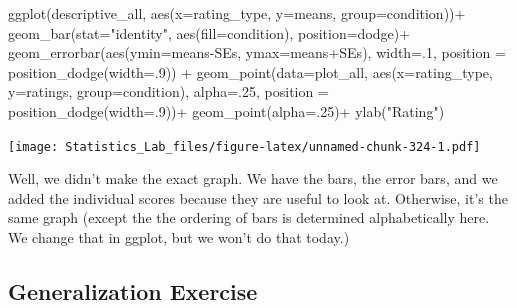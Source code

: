 \documentclass[
]{book}
\newenvironment{Shaded}{\begin{snugshade}}{\end{snugshade}}
\newcommand{\AttributeTok}[1]{\textcolor[rgb]{0.77,0.63,0.00}{#1}}
\newcommand{\DecValTok}[1]{\textcolor[rgb]{0.00,0.00,0.81}{#1}}
\newcommand{\FunctionTok}[1]{\textcolor[rgb]{0.00,0.00,0.00}{#1}}
\newcommand{\NormalTok}[1]{#1}
\newcommand{\SpecialCharTok}[1]{\textcolor[rgb]{0.00,0.00,0.00}{#1}}
\newcommand{\StringTok}[1]{\textcolor[rgb]{0.31,0.60,0.02}{#1}}
\begin{document}
\begin{Shaded}
\begin{Highlighting}[]
\FunctionTok{ggplot}\NormalTok{(descriptive\_all, }\FunctionTok{aes}\NormalTok{(}\AttributeTok{x=}\NormalTok{rating\_type, }\AttributeTok{y=}\NormalTok{means, }\AttributeTok{group=}\NormalTok{condition))}\SpecialCharTok{+} 
  \FunctionTok{geom\_bar}\NormalTok{(}\AttributeTok{stat=}\StringTok{"identity"}\NormalTok{, }\FunctionTok{aes}\NormalTok{(}\AttributeTok{fill=}\NormalTok{condition), }\AttributeTok{position=}\StringTok{\textquotesingle{}dodge\textquotesingle{}}\NormalTok{)}\SpecialCharTok{+} 
  \FunctionTok{geom\_errorbar}\NormalTok{(}\FunctionTok{aes}\NormalTok{(}\AttributeTok{ymin=}\NormalTok{means}\SpecialCharTok{{-}}\NormalTok{SEs,               }
                    \AttributeTok{ymax=}\NormalTok{means}\SpecialCharTok{+}\NormalTok{SEs), }
                \AttributeTok{width=}\NormalTok{.}\DecValTok{1}\NormalTok{, }
                \AttributeTok{position =} \FunctionTok{position\_dodge}\NormalTok{(}\AttributeTok{width=}\NormalTok{.}\DecValTok{9}\NormalTok{)) }\SpecialCharTok{+}
  \FunctionTok{geom\_point}\NormalTok{(}\AttributeTok{data=}\NormalTok{plot\_all, }\FunctionTok{aes}\NormalTok{(}\AttributeTok{x=}\NormalTok{rating\_type, }
                                \AttributeTok{y=}\NormalTok{ratings, }
                                \AttributeTok{group=}\NormalTok{condition), }
             \AttributeTok{alpha=}\NormalTok{.}\DecValTok{25}\NormalTok{, }
             \AttributeTok{position =} \FunctionTok{position\_dodge}\NormalTok{(}\AttributeTok{width=}\NormalTok{.}\DecValTok{9}\NormalTok{))}\SpecialCharTok{+}
  \FunctionTok{geom\_point}\NormalTok{(}\AttributeTok{alpha=}\NormalTok{.}\DecValTok{25}\NormalTok{)}\SpecialCharTok{+}
  \FunctionTok{ylab}\NormalTok{(}\StringTok{"Rating"}\NormalTok{)}
\end{Highlighting}
\end{Shaded}

\texttt{[image: Statistics\_Lab\_files/figure-latex/unnamed-chunk-324-1.pdf]}

Well, we didn't make the exact graph. We have the bars, the error bars, and we added the individual scores because they are useful to look at. Otherwise, it's the same graph (except the the ordering of bars is determined alphabetically here. We change that in ggplot, but we won't do that today.)

\hypertarget{generalization-exercise-6}{%
\subsection{Generalization Exercise}\label{generalization-exercise-6}}
\end{document}

